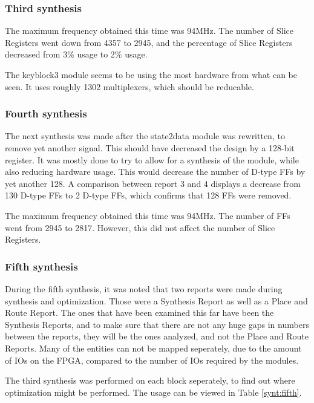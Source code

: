 \subsubsection{Third synthesis}
The maximum frequency obtained this time was 94MHz. The number of 
Slice Registers went down from 4357 to 2945, and the percentage of 
Slice Registers decreased from 3\% usage to 2\% usage.

The keyblock3 module seems to be using the most hardware from what can 
be seen. It uses roughly 1302 multiplexers, which should be reducable.

\subsubsection{Fourth synthesis}
The next synthesis was made after the state2data module was rewritten, 
to remove yet another signal. This should have decreased the design by 
a 128-bit register. It was mostly done to try to allow for a synthesis 
of the module, while also reducing hardware usage. This would decrease 
the number of D-type FFs by yet another 128. A comparison between 
report 3 and 4 displays a decrease from 130 D-type FFs to 2 D-type FFs, 
which confirms that 128 FFs were removed.

The maximum frequency obtained this time was 94MHz. The number of 
FFs went from 2945 to 2817. However, this did not affect the number of 
Slice Registers.


\subsubsection{Fifth synthesis}
During the fifth synthesis, it was noted that two reports were made 
during synthesis and optimization. Those were a Synthesis Report as 
well as a Place and Route Report. The ones that have been examined 
this far have been the Synthesis Reports, and to make sure that 
there are not any huge gaps in numbers between the reports, they will 
be the ones analyzed, and not the Place and Route Reports. Many of the 
entities can not be mapped seperately, due to the amount of IOs on the 
FPGA, compared to the number of IOs required by the modules.

The third synthesis was performed on each block seperately, to find out
where optimization might be performed. The usage can be viewed in Table 
\ref{synt:fifth}.

